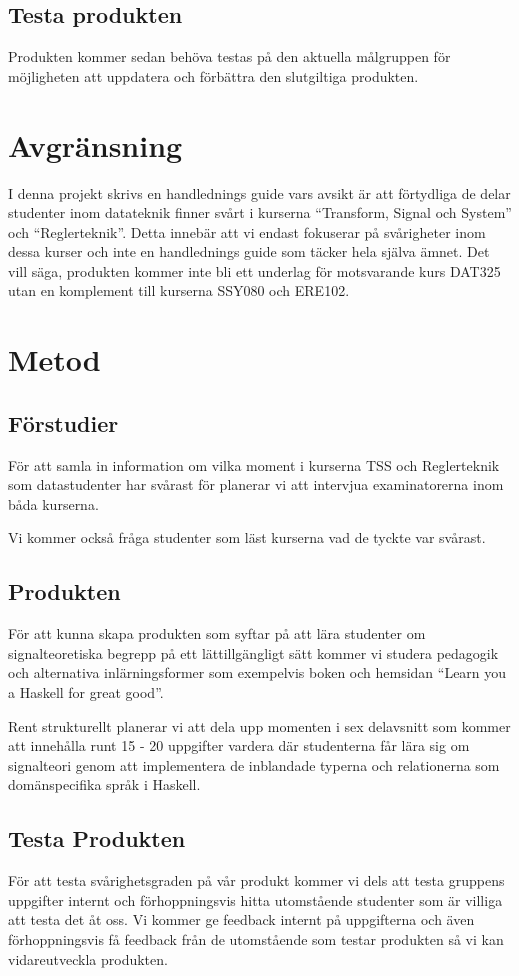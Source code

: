 \documentclass{article}
\begin{document}
\subsection{Testa produkten}
Produkten kommer sedan behöva testas på den aktuella målgruppen för
möjligheten att uppdatera och förbättra den slutgiltiga produkten.

\section{Avgränsning}
I denna projekt skrivs en handlednings guide vars avsikt är att
förtydliga de delar studenter inom datateknik finner svårt i kurserna
“Transform, Signal och System” och “Reglerteknik”.
%
Detta innebär att vi endast fokuserar på svårigheter inom dessa kurser
och inte en handlednings guide som täcker hela själva ämnet.
%
Det vill säga, produkten kommer inte bli ett underlag för motsvarande
kurs DAT325 utan en komplement till kurserna SSY080 och ERE102.

\section{Metod}
\subsection{Förstudier}
För att samla in information om vilka moment i kurserna TSS och
Reglerteknik som datastudenter har svårast för planerar vi att
intervjua examinatorerna inom båda kurserna.

Vi kommer också fråga studenter som läst kurserna vad de tyckte var
svårast.

\subsection{Produkten}
För att kunna skapa produkten som syftar på att lära studenter om
signalteoretiska begrepp på ett lättillgängligt sätt kommer vi studera
pedagogik och alternativa inlärningsformer som exempelvis boken och
hemsidan “Learn you a Haskell for great good”.

Rent strukturellt planerar vi att dela upp momenten i sex delavsnitt
som kommer att innehålla runt 15 - 20 uppgifter vardera där
studenterna får lära sig om signalteori genom att implementera de
inblandade typerna och relationerna som domänspecifika språk i
Haskell.

\subsection{Testa Produkten}
För att testa svårighetsgraden på vår produkt kommer vi dels att testa
gruppens uppgifter internt och förhoppningsvis hitta utomstående
studenter som är villiga att testa det åt oss.
%
Vi kommer ge feedback internt på uppgifterna och även förhoppningsvis
få feedback från de utomstående som testar produkten så vi kan
vidareutveckla produkten.
\end{document}
